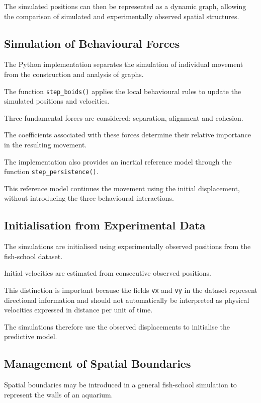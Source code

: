 \documentclass[10pt,a4paper]{article}
\begin{document}
The simulated positions can then be represented
as a dynamic graph, allowing the comparison
of simulated and experimentally observed
spatial structures.

\subsection{Simulation of Behavioural Forces}

The Python implementation separates the
simulation of individual movement from
the construction and analysis of graphs.

The function \texttt{step\_boids()} applies
the local behavioural rules to update
the simulated positions and velocities.

Three fundamental forces are considered:
separation, alignment and cohesion.

The coefficients associated with these forces
determine their relative importance in the
resulting movement.

The implementation also provides an inertial
reference model through the function
\texttt{step\_persistence()}.

This reference model continues the movement
using the initial displacement, without
introducing the three behavioural interactions.

\subsection{Initialisation from Experimental Data}

The simulations are initialised using
experimentally observed positions from
the fish-school dataset.

Initial velocities are estimated from
consecutive observed positions.

This distinction is important because
the fields \texttt{vx} and \texttt{vy}
in the dataset represent directional information
and should not automatically be interpreted
as physical velocities expressed in
distance per unit of time.

The simulations therefore use the observed
displacements to initialise the predictive model.

\subsection{Management of Spatial Boundaries}

Spatial boundaries may be introduced in
a general fish-school simulation to represent
the walls of an aquarium.
\end{document}
